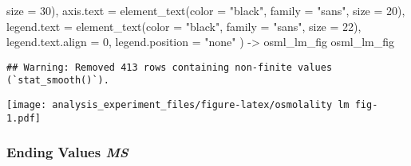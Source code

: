 \documentclass[
]{article}
\newenvironment{Shaded}{\begin{snugshade}}{\end{snugshade}}
\newcommand{\AttributeTok}[1]{\textcolor[rgb]{0.77,0.63,0.00}{#1}}
\newcommand{\DecValTok}[1]{\textcolor[rgb]{0.00,0.00,0.81}{#1}}
\newcommand{\FunctionTok}[1]{\textcolor[rgb]{0.00,0.00,0.00}{#1}}
\newcommand{\NormalTok}[1]{#1}
\newcommand{\OtherTok}[1]{\textcolor[rgb]{0.56,0.35,0.01}{#1}}
\newcommand{\StringTok}[1]{\textcolor[rgb]{0.31,0.60,0.02}{#1}}
\begin{document}
\begin{Shaded}
\begin{Highlighting}[]
                            \AttributeTok{size =} \DecValTok{30}\NormalTok{),}
        \AttributeTok{axis.text =} \FunctionTok{element\_text}\NormalTok{(}\AttributeTok{color =} \StringTok{"black"}\NormalTok{, }
                                 \AttributeTok{family =} \StringTok{"sans"}\NormalTok{, }
                                 \AttributeTok{size =} \DecValTok{20}\NormalTok{),}
        \AttributeTok{legend.text =} \FunctionTok{element\_text}\NormalTok{(}\AttributeTok{color =} \StringTok{"black"}\NormalTok{, }
                                 \AttributeTok{family =} \StringTok{"sans"}\NormalTok{, }
                                 \AttributeTok{size =} \DecValTok{22}\NormalTok{),}
        \AttributeTok{legend.text.align =} \DecValTok{0}\NormalTok{,}
        \AttributeTok{legend.position =} \StringTok{"none"}
\NormalTok{        ) }\OtherTok{{-}\textgreater{}}\NormalTok{ osml\_lm\_fig}
\NormalTok{osml\_lm\_fig}
\end{Highlighting}
\end{Shaded}

\begin{verbatim}
## Warning: Removed 413 rows containing non-finite values (`stat_smooth()`).
\end{verbatim}

\texttt{[image: analysis\_experiment\_files/figure-latex/osmolality lm fig-1.pdf]}

\hypertarget{ending-values-ms-2}{%
\subsubsection{\texorpdfstring{Ending Values
\emph{MS}}{Ending Values MS}}\label{ending-values-ms-2}}
\end{document}
